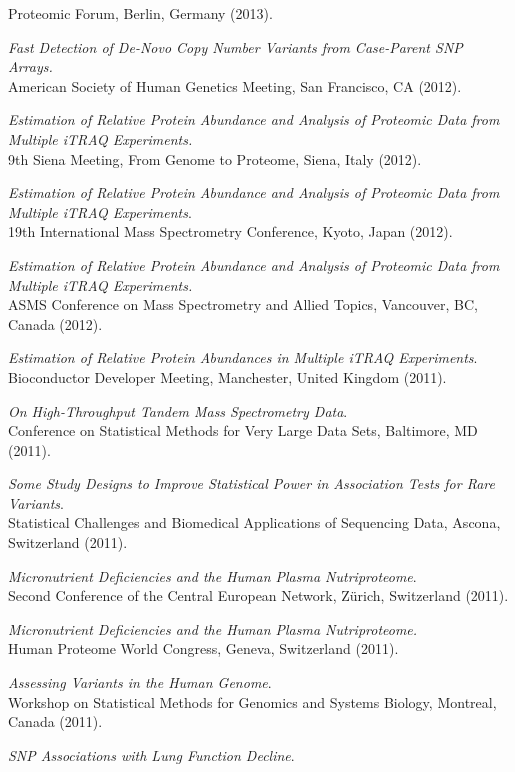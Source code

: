 \documentclass[10pt]{article}
\newcommand{\dn}[1]{{\color{black} {#1}}}
\begin{document}
Proteomic Forum, Berlin, Germany 
(2013).
\item
{\it Fast Detection of De-Novo Copy Number Variants from Case-Parent SNP Arrays.}\\
American Society of Human Genetics Meeting, San Francisco, CA
(2012).
\item
{\it Estimation of Relative Protein Abundance and Analysis of Proteomic Data from Multiple iTRAQ Experiments.}\\
9th Siena Meeting, From Genome to Proteome, Siena, Italy
(2012).
\item
{\it Estimation of Relative Protein Abundance and Analysis of Proteomic Data from Multiple iTRAQ Experiments}.\\
19th International Mass Spectrometry Conference, \dn{Kyoto, Japan}
(2012).
\item
{\it Estimation of Relative Protein Abundance and Analysis of Proteomic Data from Multiple iTRAQ Experiments.}\\
ASMS Conference on Mass Spectrometry and Allied Topics, Vancouver, BC, Canada
(2012).
\item
{\it Estimation of Relative Protein Abundances in Multiple iTRAQ Experiments}.\\
Bioconductor Developer Meeting, \dn{Manchester, United Kingdom}
(2011).
\item
{\it On High-Throughput Tandem Mass Spectrometry Data}.\\
Conference on Statistical Methods for Very Large Data Sets, \dn{Baltimore, MD} 
(2011).
\item
{\it Some Study Designs to Improve Statistical Power in Association Tests for Rare Variants}.\\
Statistical Challenges and Biomedical Applications of Sequencing Data, \dn{Ascona, Switzerland} 
(2011).
\item
{\it Micronutrient Deficiencies and the Human Plasma Nutriproteome}.\\
Second Conference of the Central European Network, \dn{Z\"urich, Switzerland}
(2011).
\item
{\it Micronutrient Deficiencies and the Human Plasma Nutriproteome.}\\
Human Proteome World Congress, Geneva, Switzerland
(2011).
\item
{\it Assessing Variants in the Human Genome}.\\
Workshop on Statistical Methods for Genomics and Systems Biology, \dn{Montreal, Canada}
(2011).
\item
{\it SNP Associations with Lung Function Decline}.\\
\end{document}
